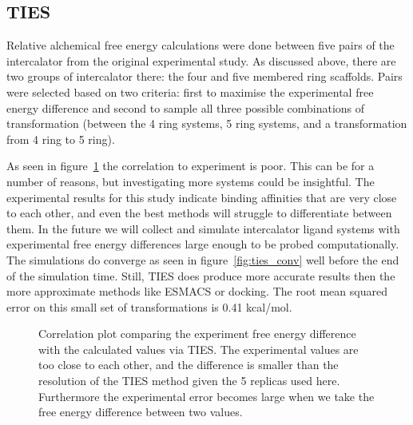 \subsection{TIES}

Relative alchemical free energy calculations were done between five pairs of the intercalator from the original experimental study. As discussed above, there are two groups of intercalator there: the four and five membered ring scaffolds. Pairs were selected based on two criteria: first to maximise the experimental free energy difference and second to sample all three possible combinations of transformation (between the 4 ring systems, 5 ring systems, and a transformation from 4 ring to 5 ring). 

As seen in figure~\ref{fig:ties} the correlation to experiment is poor. This can be for a number of reasons, but investigating more systems could be insightful. The experimental results for this study indicate binding affinities that are very close to each other, and even the best methods will struggle to differentiate between them. In the future we will collect and simulate intercalator ligand systems with experimental free energy differences large enough to be probed computationally. The simulations do converge as seen in figure~\ref{fig:ties_conv} well before the end of the simulation time. Still, TIES does produce more accurate results then the more approximate methods like ESMACS or docking. The root mean squared error on this small set of transformations is 0.41 kcal/mol.

\begin{figure}
  \centering
  
  \caption{Correlation plot comparing the experiment free energy difference with the calculated values via TIES. The experimental values are too close to each other, and the difference is smaller than the resolution of the TIES method given the 5 replicas used here. Furthermore the experimental error becomes large when we take the free energy difference between two values.}
  \label{fig:ties}
\end{figure}

